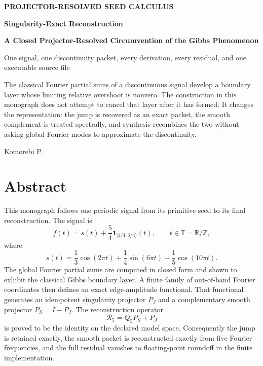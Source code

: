 \documentclass[11pt,oneside]{book}
\theoremstyle{remark}\newtheorem{remark}[theorem]{Remark}\newtheorem{boundary}[theorem]{Boundary}\newtheorem{certificate}[theorem]{Certificate}
\newcommand{\Torus}{\mathbb T}\newcommand{\C}{\mathbb C}\newcommand{\R}{\mathbb R}\newcommand{\Z}{\mathbb Z}\newcommand{\norm}[1]{\left\lVert#1\right\rVert}\newcommand{\ip}[2]{\left\langle#1,#2\right\rangle}
\begin{document}
\begin{titlepage}
\centering\vspace*{0.55in}
{\Large\color{Blue}\bfseries PROJECTOR-RESOLVED SEED CALCULUS\par}\vspace{0.18in}
{\Huge\bfseries Singularity-Exact Reconstruction\par}\vspace{0.12in}
{\LARGE\bfseries A Closed Projector-Resolved Circumvention of the Gibbs Phenomenon\par}\vspace{0.25in}
{\Large One signal, one discontinuity packet, every derivation, every residual, and one executable source file\par}
\vfill
\begin{minipage}{0.82\textwidth}\large
The classical Fourier partial sums of a discontinuous signal develop a boundary layer whose limiting relative overshoot is nonzero.  The construction in this monograph does not attempt to cancel that layer after it has formed.  It changes the representation: the jump is recovered as an exact packet, the smooth complement is treated spectrally, and synthesis recombines the two without asking global Fourier modes to approximate the discontinuity.
\end{minipage}
\vfill
{\Large Komorebi P.\par}\vspace{0.35in}
\end{titlepage}
\frontmatter
\chapter*{Abstract}
This monograph follows one periodic signal from its primitive seed to its final reconstruction.  The signal is
\[
f(t)=s(t)+\frac54\mathbf 1_{[1/4,3/4)}(t),\qquad t\in\Torus=\R/\Z,
\]
where
\[
s(t)=\frac13\cos(2\pi t)+\frac14\sin(6\pi t)-\frac15\cos(10\pi t).
\]
The global Fourier partial sums are computed in closed form and shown to exhibit the classical Gibbs boundary layer.  A finite family of out-of-band Fourier coordinates then defines an exact edge-amplitude functional.  That functional generates an idempotent singularity projector $P_J$ and a complementary smooth projector $P_S=I-P_J$.  The reconstruction operator
\[
\mathcal R_5=Q_5P_S+P_J
\]
is proved to be the identity on the declared model space.  Consequently the jump is retained exactly, the smooth packet is reconstructed exactly from five Fourier frequencies, and the full residual vanishes to floating-point roundoff in the finite implementation.
\end{document}
